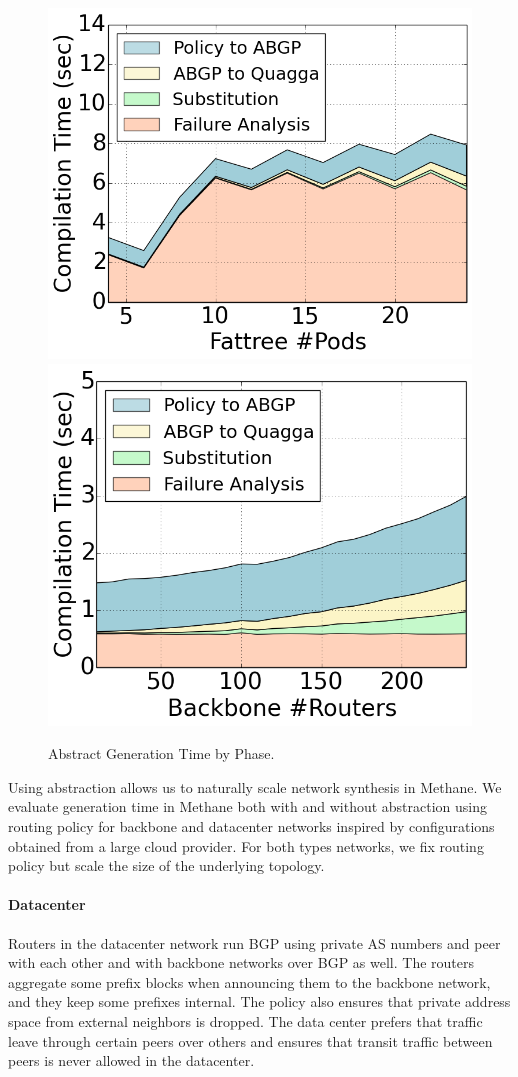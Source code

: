 \documentclass[numbers, 10pt, preprint]{sigplanconf}
\newcommand{\sysname}{{\small \sf Methane}\xspace}
\newcommand{\para}[1]{\paragraph*{\textbf{#1}}}
\begin{document}
\begin{figure}[t!]
    {\includegraphics[width=.49\columnwidth]{figures/Fattree-analysis-time.png}}
    {\includegraphics[width=.49\columnwidth]{figures/backbone-analysis-time.png}} \\
  \vspace{-.6em}
  \caption{Abstract Generation Time by Phase. \label{fig:abstract-breakdown}}
  \vspace{-1em}
\end{figure}

Using abstraction allows us to naturally scale network synthesis in \sysname. We evaluate generation time in \sysname both with and without abstraction using routing policy for backbone and datacenter networks inspired by configurations obtained from a large cloud provider. For both types networks, we fix routing policy but scale the size of the underlying topology.


\para{Datacenter}

Routers in the datacenter network run BGP using private AS numbers and peer with each other and with backbone networks over BGP as well. The routers aggregate some prefix blocks when announcing them to the backbone network, and they keep some prefixes internal. The policy also ensures that private address space from external neighbors is dropped. The data center prefers that traffic leave through certain peers over others and ensures that transit traffic between peers is never allowed in the datacenter.
\end{document}
